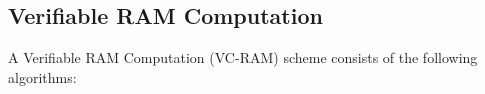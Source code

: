 




\subsection{Verifiable RAM Computation}
\begin{definition}
A Verifiable RAM Computation (VC-RAM) scheme
consists of the following algorithms:
\label{defn:vcram}
\label{defn:correct}
\end{definition}

